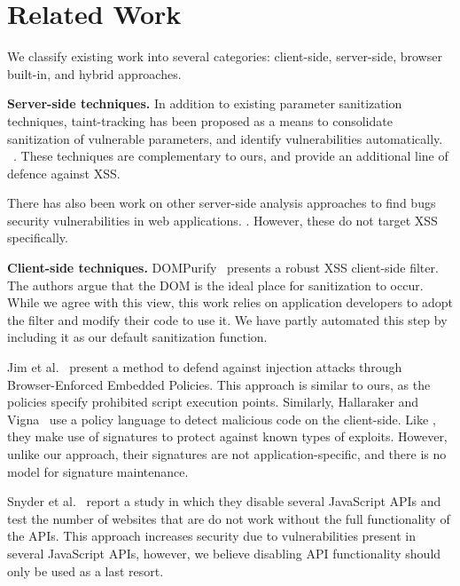 \section{Related Work}
We classify existing work into several categories: client-side, server-side, browser built-in, and hybrid approaches.

\textbf{Server-side techniques.}
In addition to existing parameter sanitization techniques,
taint-tracking has been proposed as a means to consolidate
sanitization of vulnerable parameters, and identify vulnerabilities automatically. ~\cite{10.1145/1368088.1368112, Xu:2006:TPE:1267336.1267345,DBLP:conf/sec/Nguyen-TuongGGSE05,Pietraszek:2005:DAI:2146257.2146267,Bisht:2008:XPD:1428322.1428325, 5070521}. These techniques are complementary to ours, and provide an additional line
of defence against \ac{XSS}.

There has also been work on other server-side analysis approaches
to find bugs security vulnerabilities in web applications. \cite{10.1145/1390630.1390661, 5416728, 10.1145/2393596.2393608}.
However, these do not target XSS specifically.

\textbf{Client-side techniques.}
DOMPurify~\cite{10.1007/978-3-319-66399-9_7} presents a robust
\ac{XSS} client-side filter. The authors
argue that the DOM is the ideal place for sanitization to occur. While
we agree with this view, this work relies on application developers
to adopt the filter and modify their code to use it. We have partly automated this step by including it as our default sanitization function.

Jim et al.~\cite{Jim:2007:DSI:1242572.1242654} present a method to
defend against injection attacks through Browser-Enforced Embedded
Policies. This approach is similar to ours, as the policies specify
prohibited script execution points. Similarly, Hallaraker and Vigna~\cite{Hallaraker:2005:DMJ:1078029.1078861} use a
policy language to detect malicious code on the client-side. Like \sys, they make use of signatures to protect against known types of
exploits. However, unlike our approach, their signatures are not
application-specific, and there is no model for signature
maintenance.

Snyder et al.~\cite{Snyder:2017:MWD:3133956.3133966} report a study in which
they disable several JavaScript APIs and test the number of websites
that are do not work without the full functionality of the APIs. This approach increases security due to vulnerabilities present in several
JavaScript APIs, however, we believe disabling API functionality
should only be used as a last resort.


